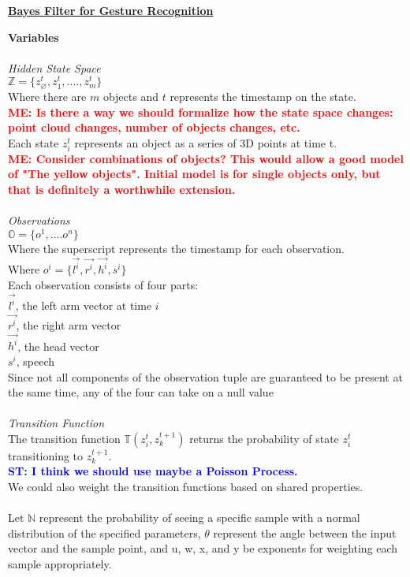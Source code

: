 \documentclass[12pt,letterpaper]{article}
\newcommand{\stnote}[1]{\textcolor{Blue}{\textbf{ST: #1}}}
\newcommand{\menote}[1]{\textcolor{Red}{\textbf{ME: #1}}}
\begin{document}
\begin{center}\textbf{\underline{Bayes Filter for Gesture Recognition}}\end{center}
\textbf{Variables}\\\\
\textit{Hidden State Space}\\
$\mathbb{Z} = \{z^t_\varnothing, z^t_1, ...., z^t_m\}$\\
Where there are $m$ objects and $t$ represents the timestamp on the state.\\
\menote{Is there a way we should formalize how the state space changes: point cloud changes, number of objects changes, etc.}\\
Each state $z^t_i$ represents an object as a series of 3D points at time t.\\
\menote{Consider combinations of objects? This would allow a good model of "The yellow objects". Initial model is for single objects only, but that is definitely a worthwhile extension.}\\\\
\textit{Observations}\\
$\mathbb{O} = \{o^1, .... o^n\}$\\
Where the superscript represents the timestamp for each observation.\\
Where $o^i= \{\vec{l^i},\vec{r^i}, \vec{h^i}, s^i\}$\\
Each observation consists of four parts:\\
$\vec{l^i}$, the left arm vector at time $i$\\
$\vec{r^i}$, the right arm vector\\
$\vec{h^i}$, the head vector\\
$s^i$, speech\\
Since not all components of the observation tuple are guaranteed to be present at the same time, any of the four can take on a null value\\\\
\textit{Transition Function}\\
The transition function $\mathbb{T}(z^t_i, z^{t+1}_k)$ returns the probability of state $z^t_i$ transitioning to $z^{t+1}_k$.\\
\stnote{I think we should use maybe a Poisson Process. }\\
We could also weight the transition functions based on shared properties.\\\\
Let $\mathbb{N}$ represent the probability of seeing a specific sample with a  normal distribution of the specified parameters,  $\theta$ represent the angle between the input vector and the sample point, and u, w, x, and y be exponents for weighting each sample appropriately.\\\\
\end{document}
